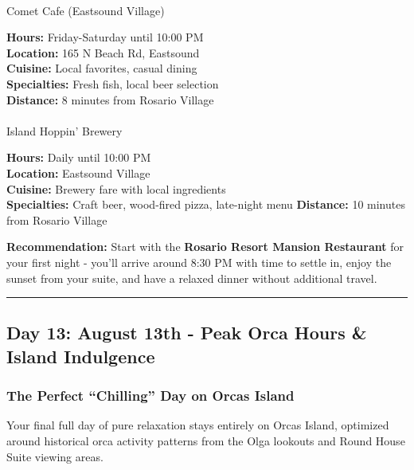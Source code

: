 \documentclass[
  11pt,
  letterpaper,
  DIV=10,
  numbers=noendperiod]{scrartcl}
\makeatletter
\let\oldparagraph\paragraph
\renewcommand{\paragraph}{
    \@ifstar
      \xxxParagraphStar
      \xxxParagraphNoStar
  }
\newcommand{\xxxParagraphStar}[1]{\oldparagraph*{#1}\mbox{}}
\newcommand{\xxxParagraphNoStar}[1]{\oldparagraph{#1}\mbox{}}
\makeatother
\begin{document}
\paragraph{Comet Cafe (Eastsound
Village)}\label{comet-cafe-eastsound-village}

\textbf{Hours:} Friday-Saturday until 10:00 PM\\
\textbf{Location:} 165 N Beach Rd, Eastsound\\
\textbf{Cuisine:} Local favorites, casual dining\\
\textbf{Specialties:} Fresh fish, local beer selection\\
\textbf{Distance:} 8 minutes from Rosario Village

\paragraph{Island Hoppin' Brewery}\label{island-hoppin-brewery}

\textbf{Hours:} Daily until 10:00 PM\\
\textbf{Location:} Eastsound Village\\
\textbf{Cuisine:} Brewery fare with local ingredients\\
\textbf{Specialties:} Craft beer, wood-fired pizza, late-night menu
\textbf{Distance:} 10 minutes from Rosario Village

\textbf{Recommendation:} Start with the \textbf{Rosario Resort Mansion
Restaurant} for your first night - you'll arrive around 8:30 PM with
time to settle in, enjoy the sunset from your suite, and have a relaxed
dinner without additional travel.

\begin{center}\rule{0.5\linewidth}{0.5pt}\end{center}

\subsection{Day 13: August 13th - Peak Orca Hours \& Island
Indulgence}\label{day-13-august-13th---peak-orca-hours-island-indulgence}

\subsubsection{The Perfect ``Chilling'' Day on Orcas
Island}\label{the-perfect-chilling-day-on-orcas-island}

Your final full day of pure relaxation stays entirely on Orcas Island,
optimized around historical orca activity patterns from the Olga
lookouts and Round House Suite viewing areas.
\end{document}
